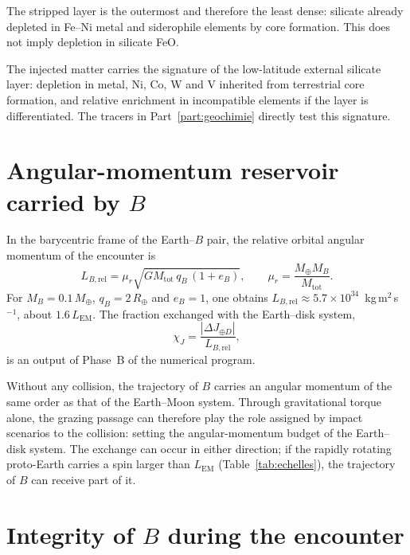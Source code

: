 \documentclass[11pt,a4paper,openany]{report}
\newcommand{\Mt}{M_{\oplus}}
\newcommand{\Rt}{R_{\oplus}}
\newcommand{\Mtot}{M_{\mathrm{tot}}}
\begin{document}
\begin{ideephys}
The stripped layer is the outermost and therefore the least dense: silicate already depleted in
Fe--Ni metal and siderophile elements by core formation. This does not imply depletion in
silicate FeO.
\end{ideephys}

\begin{consequence}
The injected matter carries the signature of the low-latitude external silicate layer: depletion in
metal, Ni, Co, W and V inherited from terrestrial core formation, and relative enrichment in
incompatible elements if the layer is differentiated. The tracers in Part~\ref{part:geochimie}
directly test this signature.
\end{consequence}

\section{Angular-momentum reservoir carried by \texorpdfstring{$B$}{B}}

In the barycentric frame of the Earth--$B$ pair, the relative orbital angular momentum of the
encounter is
\begin{equation}
L_{B,\mathrm{rel}}=\mu_r\sqrt{G\Mtot\,q_B\,(1+e_B)},
\qquad \mu_r=\frac{\Mt M_B}{\Mtot}.
\label{eq:LBrel}
\end{equation}
For $M_B=0.1\,\Mt$, $q_B=2\,\Rt$ and $e_B=1$, one obtains
$L_{B,\mathrm{rel}}\approx5.7\times10^{34}$~kg\,m$^2$\,s$^{-1}$, about $1.6\,L_{\mathrm{EM}}$.
The fraction exchanged with the Earth--disk system,
\begin{equation}
\chi_J=\frac{|\Delta J_{\oplus D}|}{L_{B,\mathrm{rel}}},
\label{eq:chiJ}
\end{equation}
is an output of Phase~B of the numerical program.

\begin{apport}
Without any collision, the trajectory of $B$ carries an angular momentum of the same order as that
of the Earth--Moon system. Through gravitational torque alone, the grazing passage can therefore
play the role assigned by impact scenarios to the collision: setting the angular-momentum budget of
the Earth--disk system. The exchange can occur in either direction; if the rapidly rotating
proto-Earth carries a spin larger than $L_{\mathrm{EM}}$ (Table~\ref{tab:echelles}), the trajectory of
$B$ can receive part of it.
\end{apport}

\section{Integrity of \texorpdfstring{$B$}{B} during the encounter}
\end{document}
